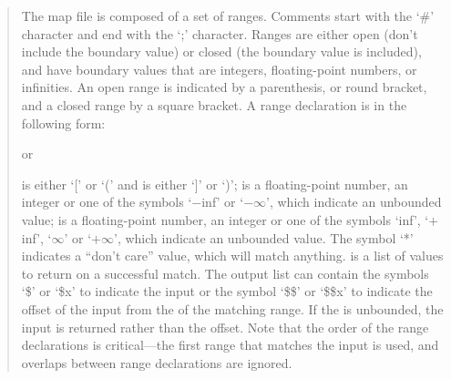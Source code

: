 \begin{quote}
The map file is composed of a set of ranges.
Comments start with the `\#' character and end with the `;' character.
Ranges are either open (don't include the boundary value) or closed (the boundary value is included),
and have boundary values that are integers, floating-point numbers, or infinities.
An open range is indicated by a parenthesis, or round bracket, and a closed range by a square bracket.
A range declaration is in the following form:

\centerline{ or }

 is either `[' or `(' and  is either `]' or `)';
 is a floating-point number, an integer or one of the symbols `$-$inf' or
`$-\infty$', which indicate an unbounded value;
 is a floating-point number, an integer or one of the symbols
`inf', `$+$inf', `$\infty$' or `$+\infty$', which indicate an unbounded value.
The symbol `*' indicates a ``don't care'' value, which will match anything.
 is a list of values to return on a successful match.
The output list can contain the symbols `\$' or `\$x' to indicate the input or the symbol `\$\$'
or `\$\$x' to indicate the offset of the input from the  of the matching range.
If the  is unbounded, the input is returned rather than the offset.
Note that the order of the range declarations is critical---the first range that matches the input
is used, and overlaps between range declarations are ignored.
\end{quote}

\objItemMessage

\objItemComments


